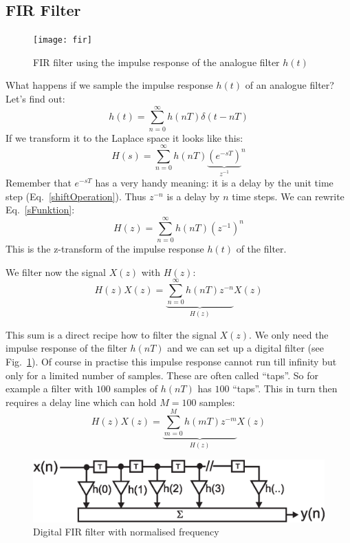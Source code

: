 \documentclass[12pt,a4paper]{article}
\begin{document}
\subsection{FIR Filter}
\begin{figure}[!hbt]
\begin{center}
\mbox{\texttt{[image: fir]}}
\caption{FIR filter using the impulse response of the analogue filter $h(t)$ \label{FIRfilter}}
\end{center}
\end{figure}
What happens if we sample the impulse response $h(t)$ of an
analogue filter? Let's find out:
\begin{equation}
\label{sampltime}
h(t)=\sum_{n=0}^\infty h(nT) \delta(t-nT)
\end{equation}
If we transform it to the Laplace space it looks like this:
\begin{equation}
\label{sFunktion}
H(s)=\sum_{n=0}^\infty h(nT) {\underbrace{{\left(e^{-sT}\right)}}_
                                           {z^{-1}}}^n
\end{equation}
Remember that $e^{-sT}$ has a very handy meaning: it is a delay
by the unit time step (Eq.~\ref{shiftOperation}).
Thus $z^{-n}$ is a delay by $n$ time steps.
We can rewrite Eq.~\ref{sFunktion}:
\begin{equation}
H(z)=\sum_{n=0}^\infty h(nT) {(z^{-1})}^n \label{ztrans}
\end{equation}
This is the z-transform of the impulse response $h(t)$ of the filter.

We filter now the signal $X(z)$ with $H(z)$:
\begin{equation}
H(z)X(z)=\underbrace{\sum_{n=0}^\infty h(nT) z^{-n}}_{H(z)} X(z) \label{notFIRyet}
\end{equation}

This sum is a direct recipe how to filter the signal $X(z)$. We only
need the impulse response of the filter $h(nT)$ and we can
set up a digital filter (see Fig.~\ref{FIRfilter}). Of course
in practise this impulse response cannot run till infinity
but only for a limited number of samples. These are often
called ``taps''. So for example a filter with $100$ samples of $h(nT)$ has
$100$ ``taps''. This in turn then requires a delay line which
can hold $M=100$ samples:
\begin{equation}
\label{FIRz}
H(z)X(z)=\underbrace{\sum_{m=0}^M h(mT) z^{-m}}_{H(z)} X(z) \label{FIRfromAnalogue}
\end{equation}

\begin{figure}[!hbt]
\begin{center}
\mbox{\includegraphics[width=\linewidth]{fir_digital}}
\caption{Digital FIR filter with normalised frequency \label{fir_digital}}
\end{center}
\end{figure}
\end{document}
